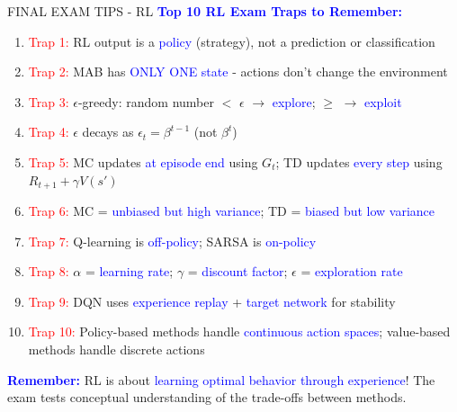 \documentclass[8pt]{beamer}
\begin{document}
	\begin{frame}{FINAL EXAM TIPS - RL}
		\fontsize{6.5}{7.5}\selectfont
		\textcolor{blue}{\textbf{Top 10 RL Exam Traps to Remember:}}
		
		\begin{enumerate}
			\item \textcolor{red}{Trap 1:} RL output is a \textcolor{blue}{policy} (strategy), not a prediction or classification
			\item \textcolor{red}{Trap 2:} MAB has \textcolor{blue}{ONLY ONE state} - actions don't change the environment
			\item \textcolor{red}{Trap 3:} $\epsilon$-greedy: random number $<$ $\epsilon$ $\rightarrow$ \textcolor{blue}{explore}; $\ge$ $\rightarrow$ \textcolor{blue}{exploit}
			\item \textcolor{red}{Trap 4:} $\epsilon$ decays as $\epsilon_t = \beta^{t-1}$ (not $\beta^t$)
			\item \textcolor{red}{Trap 5:} MC updates \textcolor{blue}{at episode end} using $G_t$; TD updates \textcolor{blue}{every step} using $R_{t+1} + \gamma V(s')$
			\item \textcolor{red}{Trap 6:} MC = \textcolor{blue}{unbiased but high variance}; TD = \textcolor{blue}{biased but low variance}
			\item \textcolor{red}{Trap 7:} Q-learning is \textcolor{blue}{off-policy}; SARSA is \textcolor{blue}{on-policy}
			\item \textcolor{red}{Trap 8:} $\alpha$ = \textcolor{blue}{learning rate}; $\gamma$ = \textcolor{blue}{discount factor}; $\epsilon$ = \textcolor{blue}{exploration rate}
			\item \textcolor{red}{Trap 9:} DQN uses \textcolor{blue}{experience replay} + \textcolor{blue}{target network} for stability
			\item \textcolor{red}{Trap 10:} Policy-based methods handle \textcolor{blue}{continuous action spaces}; value-based methods handle discrete actions
		\end{enumerate}
		
		\textcolor{blue}{\textbf{Remember:}} RL is about \textcolor{blue}{learning optimal behavior through experience}! The exam tests conceptual understanding of the trade-offs between methods.
	\end{frame}
	
\end{document}
